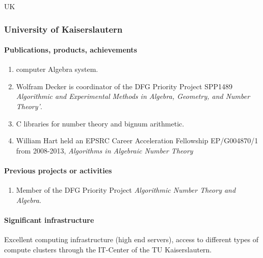 \begin{sitedescription}{UK}
\subsubsection{University of Kaiserslautern}






\paragraph{Publications, products, achievements}

\begin{enumerate}
\item {} computer Algebra system.
\item Wolfram Decker is coordinator of the DFG Priority Project SPP1489 \emph{Algorithmic and Experimental Methods in Algebra, Geometry, and
Number Theory'}.
\item {} C libraries for number theory and bignum arithmetic.
\item William Hart held an EPSRC Career Acceleration Fellowship EP/G004870/1 
from 2008-2013, \emph{Algorithms in Algebraic Number Theory}
\end{enumerate}

\paragraph{Previous projects or activities}

\begin{enumerate}
\item Member of the DFG Priority Project \emph{Algorithmic Number Theory and Algebra}.
\end{enumerate}

\paragraph{Significant infrastructure}

Excellent computing infrastructure (high end servers), access to 
different types of compute clusters through the IT-Center of the 
TU Kaiserslautern.
\end{sitedescription}



